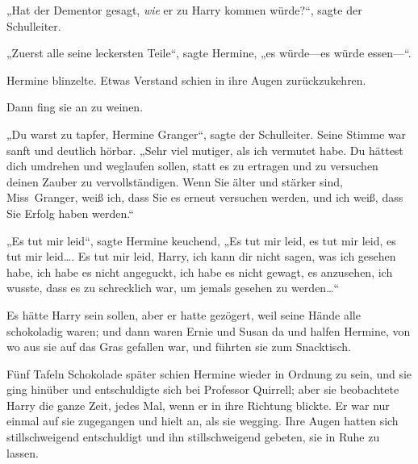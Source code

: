 „Hat der Dementor gesagt, \emph{wie} er zu Harry kommen würde?“, sagte der Schulleiter.

„Zuerst alle seine leckersten Teile“, sagte Hermine, „es würde—es würde essen—“.

Hermine blinzelte. Etwas Verstand schien in ihre Augen zurückzukehren.

Dann fing sie an zu weinen.

„Du warst zu tapfer, Hermine Granger“, sagte der Schulleiter. Seine Stimme war sanft und deutlich hörbar. „Sehr viel mutiger, als ich vermutet habe. Du hättest dich umdrehen und weglaufen sollen, statt es zu ertragen und zu versuchen deinen Zauber zu vervollständigen. Wenn Sie älter und stärker sind, Miss~Granger, weiß ich, dass Sie es erneut versuchen werden, und ich weiß, dass Sie Erfolg haben werden.“

„Es tut mir leid“, sagte Hermine keuchend, „Es tut mir leid, es tut mir leid, es tut mir leid…. Es tut mir leid, Harry, ich kann dir nicht sagen, was ich gesehen habe, ich habe es nicht angeguckt, ich habe es nicht gewagt, es anzusehen, ich wusste, dass es zu schrecklich war, um jemals gesehen zu werden…“

Es hätte Harry sein sollen, aber er hatte gezögert, weil seine Hände alle schokoladig waren; und dann waren Ernie und Susan da und halfen Hermine, von wo aus sie auf das Gras gefallen war, und führten sie zum Snacktisch.

Fünf Tafeln Schokolade später schien Hermine wieder in Ordnung zu sein, und sie ging hinüber und entschuldigte sich bei Professor Quirrell; aber sie beobachtete Harry die ganze Zeit, jedes Mal, wenn er in ihre Richtung blickte. Er war nur einmal auf sie zugegangen und hielt an, als sie wegging. Ihre Augen hatten sich stillschweigend entschuldigt und ihn stillschweigend gebeten, sie in Ruhe zu lassen.

